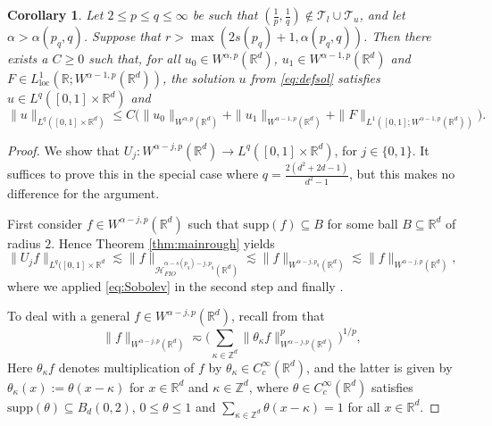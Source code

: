 \documentclass{amsart}
\numberwithin{equation}{section}
\newtheorem{corollary}[theorem]{Corollary}
\theoremstyle{definition}
\newcommand{\R}{\mathbb{R}}
\newcommand{\Rd}{\mathbb{R}^{d}}
\newcommand{\Z}{\mathbb{Z}}
\newcommand {\HT}{\mathcal{H}}
\newcommand {\loc}{\mathrm{loc}}
\newcommand {\supp}{\mathrm{supp}}
\begin{document}
\begin{corollary}\label{cor:extrabutweak}
Let $2\leq p\leq q\leq \infty$ be such that $(\frac{1}{p},\frac{1}{q})\notin \mathcal{T}_{l}\cup \mathcal{T}_{u}$, and let $\alpha>\alpha(p_{q},q)$. Suppose that $r>\max(2s(p_{q})+1,\alpha(p_{q},q))$. Then there exists a $C\geq0$ such that, for all $u_{0}\in W^{\alpha,p}(\R^d)$, $u_{1}\in W^{\alpha-1,p}(\R^d)$ and $F\in L^{1}_{\loc}(\R;W^{\alpha-1,p}(\R^d))$, the solution $u$ from \eqref{eq:defsol} satisfies $u\in L^{q}([0,1]\times\R^d)$ and
\[
\|u\|_{L^{q}([0,1]\times \R^d)}\leq C\big(\|u_{0}\|_{W^{\alpha,p}(\R^d)}+\|u_{1}\|_{W^{\alpha-1,p}(\R^d)}+\|F\|_{L^{1}([0,1];W^{\alpha-1,p}(\R^d))}\big).
\]
\end{corollary}
\begin{proof}
We show that $U_{j}:W^{\alpha-j,p}(\Rd)\to L^{q}([0,1]\times\Rd)$, for $j\in\{0,1\}$. It suffices to prove this in the special case where $q=\frac{2(d^{2}+2d-1)}{d^{2}-1}$, but this makes no difference for the argument.

First consider $f\in W^{\alpha-j,p}(\Rd)$ such that $\supp(f)\subseteq B$ for some ball $B\subseteq \Rd$ of radius $2$.   
Hence Theorem \ref{thm:mainrough} yields
\begin{equation}\label{eq:localsmoothcompact}
\|U_{j}f\|_{L^{q}([0,1]\times\Rd}\lesssim \|f\|_{\HT^{\alpha-s(p_{q})-j,p_{q}}_{FIO}(\Rd)}\lesssim \|f\|_{W^{\alpha-j,p_{q}}(\Rd)}\lesssim \|f\|_{W^{\alpha-j,p}(\Rd)},
\end{equation}
where we applied \eqref{eq:Sobolev} in the second step and finally \cite[Lemma 3.3.1]{Triebel10}.

To deal with a general $f\in W^{\alpha-j,p}(\Rd)$, recall from \cite[Proposition 7.2]{Triebel92} that 
\begin{equation}\label{eq:localization}
\|f\|_{W^{\alpha-j,p}(\Rd)}\eqsim \Big(\sum_{\kappa\in \Z^{d}}\|\theta_{\kappa}f\|_{W^{\alpha-j,p}(\Rd)}^{p}\Big)^{1/p},
\end{equation}
Here $\theta_{\kappa}f$ denotes multiplication of $f$ by $\theta_{\kappa}\in C^{\infty}_{c}(\Rd)$, and the latter is given by $\theta_{\kappa}(x):=\theta(x-\kappa)$ for $x\in\Rd$ and $\kappa\in \Z^{d}$, where $\theta\in C^{\infty}_{c}(\Rd)$ satisfies $\supp(\theta)\subseteq B_{d}(0,2)$, $0\leq \theta\leq 1$ and  $\sum_{\kappa\in \Z^{d}}\theta(x-\kappa)=1$ for all $x\in\Rd$. 


\end{proof}
\end{document}
